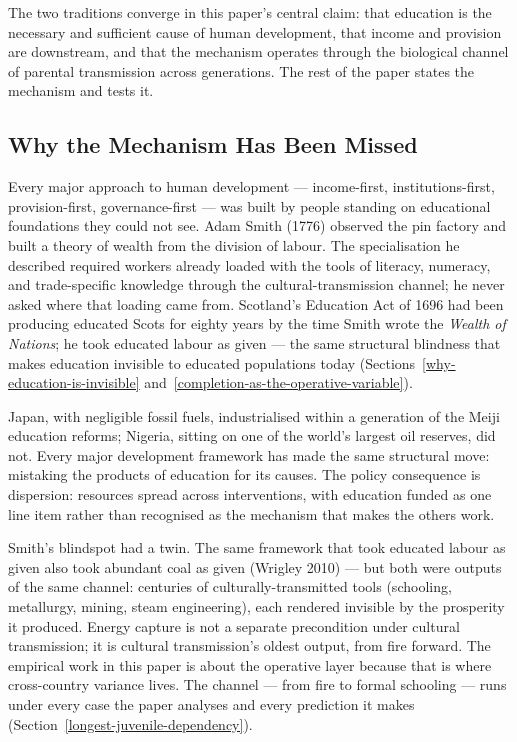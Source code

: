\documentclass[12pt,letterpaper]{article}
\begin{document}
The two traditions converge in this paper's central claim: that
education is the necessary and sufficient cause of human development,
that income and provision are downstream, and that the mechanism
operates through the biological channel of parental transmission
across generations. The rest of the paper states the mechanism and
tests it.

\subsection{Why the Mechanism Has Been Missed}\label{why-the-mechanism-has-been-missed}

Every major approach to human development --- income-first,
institutions-first, provision-first, governance-first --- was built by
people standing on educational foundations they could not see. Adam
Smith (1776) observed the pin factory and built a theory of wealth
from the division of labour. The specialisation he described required
workers already loaded with the tools of literacy, numeracy, and
trade-specific knowledge through the cultural-transmission channel;
he never asked where that loading came from. Scotland's Education Act
of 1696 had been producing educated Scots for eighty years by the time
Smith wrote the \emph{Wealth of Nations}; he took educated labour as
given --- the same structural blindness that makes education invisible
to educated populations today
(Sections~\ref{why-education-is-invisible}
and~\ref{completion-as-the-operative-variable}).

Japan, with negligible fossil fuels, industrialised within a
generation of the Meiji education reforms; Nigeria, sitting on one of
the world's largest oil reserves, did not. Every major development
framework has made the same structural move: mistaking the products
of education for its causes. The policy consequence is dispersion:
resources spread across interventions, with education funded as one
line item rather than recognised as the mechanism that makes the
others work.

Smith's blindspot had a twin. The same framework that took educated
labour as given also took abundant coal as given (Wrigley 2010) ---
but both were outputs of the same channel: centuries of
culturally-transmitted tools (schooling, metallurgy, mining, steam
engineering), each rendered invisible by the prosperity it produced. Energy capture is
not a separate precondition under cultural transmission; it is
cultural transmission's oldest output, from fire forward. The
empirical work in this paper is about the operative layer because
that is where cross-country variance lives. The channel --- from fire
to formal schooling --- runs under every case the paper analyses and
every prediction it makes (Section~\ref{longest-juvenile-dependency}).
\end{document}
